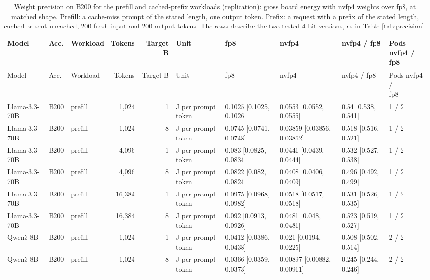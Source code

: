 \begin{landscape}
\begingroup
\scriptsize
\setlength{\tabcolsep}{3pt}
\begin{longtable}{lllrrlllll}
\caption{Weight precision on B200 for the prefill and cached-prefix workloads (replication): gross board energy with nvfp4 weights over fp8, at matched shape. Prefill: a cache-miss prompt of the stated length, one output token. Prefix: a request with a prefix of the stated length, cached or sent uncached, 200 fresh input and 200 output tokens. The rows describe the two tested 4-bit versions, as in Table \ref{tab:precision}.}\label{tab:precision_other}\\
\toprule
Model & Acc. & Workload & Tokens & Target B & Unit & fp8 & nvfp4 & nvfp4 / fp8 & \makecell[l]{Pods nvfp4 /\\fp8} \\
\midrule
\endfirsthead
\toprule
Model & Acc. & Workload & Tokens & Target B & Unit & fp8 & nvfp4 & nvfp4 / fp8 & \makecell[l]{Pods nvfp4 /\\fp8} \\
\midrule
\endhead
\bottomrule
\endfoot
Llama-3.3-70B & B200 & prefill & 1,024 & 1 & J per prompt token & 0.1025 {[}0.1025, 0.1026{]} & 0.0553 {[}0.0552, 0.0555{]} & 0.54 {[}0.538, 0.541{]} & 1 / 2 \\
Llama-3.3-70B & B200 & prefill & 1,024 & 8 & J per prompt token & 0.0745 {[}0.0741, 0.0748{]} & 0.03859 {[}0.03856, 0.03862{]} & 0.518 {[}0.516, 0.521{]} & 1 / 2 \\
Llama-3.3-70B & B200 & prefill & 4,096 & 1 & J per prompt token & 0.083 {[}0.0825, 0.0834{]} & 0.0441 {[}0.0439, 0.0444{]} & 0.532 {[}0.527, 0.538{]} & 1 / 2 \\
Llama-3.3-70B & B200 & prefill & 4,096 & 8 & J per prompt token & 0.0822 {[}0.082, 0.0824{]} & 0.0408 {[}0.0406, 0.0409{]} & 0.496 {[}0.492, 0.499{]} & 1 / 2 \\
Llama-3.3-70B & B200 & prefill & 16,384 & 1 & J per prompt token & 0.0975 {[}0.0968, 0.0982{]} & 0.0518 {[}0.0517, 0.0518{]} & 0.531 {[}0.526, 0.535{]} & 1 / 2 \\
Llama-3.3-70B & B200 & prefill & 16,384 & 8 & J per prompt token & 0.092 {[}0.0913, 0.0926{]} & 0.0481 {[}0.048, 0.0481{]} & 0.523 {[}0.519, 0.527{]} & 1 / 2 \\
Qwen3-8B & B200 & prefill & 1,024 & 1 & J per prompt token & 0.0412 {[}0.0386, 0.0438{]} & 0.021 {[}0.0194, 0.0225{]} & 0.508 {[}0.502, 0.514{]} & 2 / 2 \\
Qwen3-8B & B200 & prefill & 1,024 & 8 & J per prompt token & 0.0366 {[}0.0359, 0.0373{]} & 0.00897 {[}0.00882, 0.00911{]} & 0.245 {[}0.244, 0.246{]} & 2 / 2 \\

\end{longtable}
\end{landscape}
